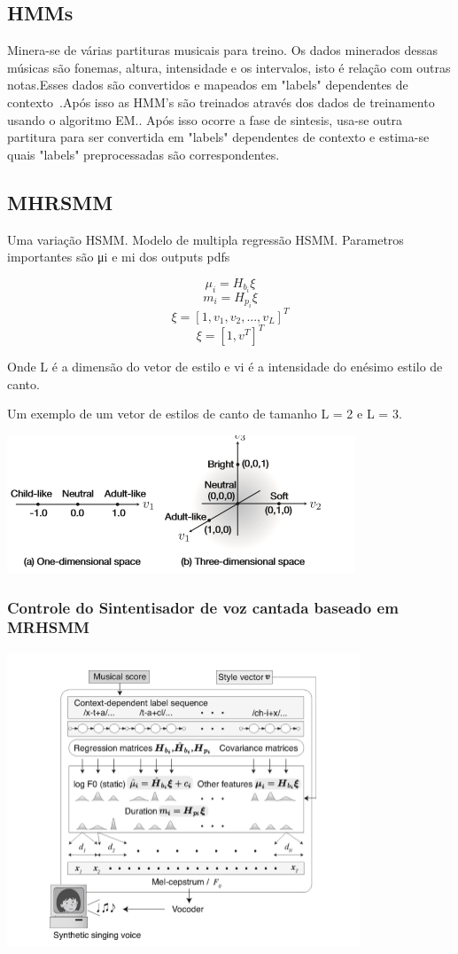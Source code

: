 	\subsection{HMMs}
		Minera-se de várias partituras musicais para treino. Os dados minerados dessas músicas são fonemas, altura, intensidade e os intervalos, isto é relação com outras notas.Esses dados são convertidos e mapeados em "labels" dependentes de contexto~\cite{DegottexNada}.Após isso as HMM's são treinados através dos dados de treinamento usando o algoritmo EM.\cite{GudnasonNada}. Após isso ocorre a fase de sintesis, usa-se outra partitura para ser convertida em "labels" dependentes de contexto e estima-se quais "labels" preprocessadas são correspondentes.\cite{TakashiNose}
	
		\subsection{MHRSMM}
		Uma variação HSMM. Modelo de multipla regressão HSMM.
		Parametros importantes são μi e mi dos outputs pdfs
		
		\[ \mu_i = H_b_i \xi \] 
		\[	m_i   = H_p_i \xi  \]
		\[ \xi   = [1,v_1,v_2,...,v_L]^T \]	
		\[ \xi   = [1,v^T]^T	\]	
		
		Onde L é a dimensão do vetor de estilo e vi  é  a intensidade do  enésimo estilo de canto.
		
		Um exemplo de um vetor de estilos de canto de tamanho L =  2 e L = 3.
		
		\includegraphics{exemploHMM.png}
		
		\subsubsection{Controle do Sintentisador de voz cantada baseado em MRHSMM}
		
		\includegraphics{esquemaHMM.png}
		
